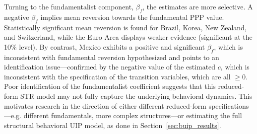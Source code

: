\documentclass[a4paper,10pt,final]{article}    %
\begin{document}
Turning to the fundamentalist component, $\beta_f$, the estimates are more selective. A negative $\beta_f$ implies mean reversion towards the fundamental PPP value. Statistically significant mean reversion is found for Brazil, Korea, New Zealand, and Switzerland, while the Euro Area displays weaker evidence (significant at the 10\% level). By contrast, Mexico exhibits a positive and significant $\beta_f$, which is inconsistent with fundamental reversion hypothesized and points to an identification issue---confirmed by the negative value of the estimated $c$, which is inconsistent with the specification of the transition variables, which are all $\geq 0$. Poor identification of the fundamentalist coefficient suggests that this reduced-form STR model may not fully capture the underlying behavioral dynamics. This motivates research in the direction of either different reduced-form specifications---e.g. different fundamentals, more complex structures---or estimating the full structural behavioral UIP model, as done in Section~\ref{sec:buip_results}.
\end{document}
